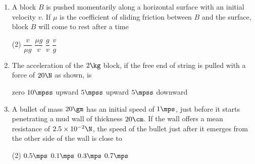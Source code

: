 \documentclass{article}
\renewcommand{\ans}{\quad}
\begin{document}
\begin{enumerate}
        \item A block $B$ is pushed momentarily along a horizontal surface with an initial velocity $v$. If $\mu$ is the coefficient of sliding friction between $B$ and the surface, block $B$ will come to rest after a time 
        \begin{center}
        \end{center}
        \begin{tasks}(2)
            \task $\dfrac{v}{\mu g}$\ans
            \task $\dfrac{\mu g}{v}$
            \task $\dfrac{g}{v}$
            \task $\dfrac{v}{g}$
        \end{tasks}


    \item The acceleration of the $2 \kg$ block, if the free end of string is pulled with a force of $20 \N$ as shown, is
    \begin{multicols}{2}
        \begin{tasks}
            \task zero
            \task $10\mpss$ upward\ans
            \task $5\mpss$ upward
            \task $5\mpss$ downward
        \end{tasks}
    \columnbreak
        \begin{center}
        \end{center}
    \end{multicols}


        \item A bullet of mass $20\gm$ has an initial speed of $1\mps$, just before it starts penetrating a mud wall of thickness $20\cm$. If the wall offers a mean resistance of $2.5\times 10^{-2}\N$, the speed of the bullet just after it emerges from the other side of the wall is close to 
        \begin{tasks}(2)
            \task $0.5\mps$
            \task $0.1\mps$
            \task $0.3\mps$
            \task $0.7\mps$\ans
        \end{tasks}


\end{enumerate}
\end{document}

